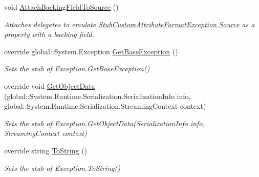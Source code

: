 \begin{DoxyCompactItemize}
void \hyperlink{class_system_1_1_reflection_1_1_fakes_1_1_stub_custom_attribute_format_exception_a3ed02218648ea0ce7e47c64315a2ed4e}{Attach\-Backing\-Field\-To\-Source} ()
\begin{DoxyCompactList}\small\item\em Attaches delegates to emulate \hyperlink{class_system_1_1_reflection_1_1_fakes_1_1_stub_custom_attribute_format_exception_a943889f7bbbf383d140691ca827af3bc}{Stub\-Custom\-Attribute\-Format\-Exception.\-Source} as a property with a backing field.\end{DoxyCompactList}\item 
override global\-::\-System.\-Exception \hyperlink{class_system_1_1_reflection_1_1_fakes_1_1_stub_custom_attribute_format_exception_a4c3bff930a41b40f3c181e08257273bd}{Get\-Base\-Exception} ()
\begin{DoxyCompactList}\small\item\em Sets the stub of Exception.\-Get\-Base\-Exception()\end{DoxyCompactList}\item 
override void \hyperlink{class_system_1_1_reflection_1_1_fakes_1_1_stub_custom_attribute_format_exception_a637ce3ebdcc54ba7f56a706311f4846e}{Get\-Object\-Data} (global\-::\-System.\-Runtime.\-Serialization.\-Serialization\-Info info, global\-::\-System.\-Runtime.\-Serialization.\-Streaming\-Context context)
\begin{DoxyCompactList}\small\item\em Sets the stub of Exception.\-Get\-Object\-Data(\-Serialization\-Info info, Streaming\-Context context)\end{DoxyCompactList}\item 
override string \hyperlink{class_system_1_1_reflection_1_1_fakes_1_1_stub_custom_attribute_format_exception_a174f5578fb15cd88cc7cde3f3d09715d}{To\-String} ()
\begin{DoxyCompactList}\small\item\em Sets the stub of Exception.\-To\-String()\end{DoxyCompactList}\end{DoxyCompactItemize}
